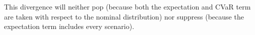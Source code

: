 \documentclass[ijoc,nonblindrev]{informs3} %
\newcommand{\E}{\mathbb{E}}
\newcommand{\e}[1]{\E \left[ #1 \right]}
\begin{document}
\begin{remark}
	This divergence will neither pop (because both the expectation and CVaR term are taken with respect to the nominal distribution) nor suppress (because the expectation term includes every scenario).
\end{remark}

% 
% 
% 
% 
\end{document}
